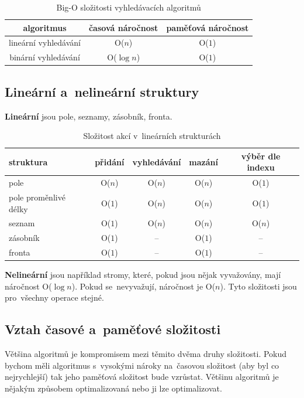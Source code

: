 \begin{table}[h]
	\centering
	\caption{Big-O složitosti vyhledávacích algoritmů}
	\begin{tabular}{|c||c|c|}\hline
		algoritmus           & časová náročnost      & paměťová náročnost \\\hline\hline
		lineární vyhledávání & O($n$)                & O($1$) \\\hline
		binární vyhledávání  & O($\log n$)           & O($1$) \\\hline
	\end{tabular}
\end{table}

\subsection{Lineární a~nelineární struktury}

\textbf{Lineární} jsou pole, seznamy, zásobník, fronta.

\begin{table}[h]
	\centering
	\caption{Složitost akcí v~lineárních strukturách}
	\begin{tabular}{|l||c|c|c|c|}\hline
		struktura             & přidání & vyhledávání & mazání & výběr dle indexu \\\hline\hline
		pole                  & O($n$)  & O($n$)      & O($n$) & O($1$) \\\hline
		pole proměnlivé délky & O($1$)  & O($n$)      & O($n$) & O($1$) \\\hline
		seznam                & O($1$)  & O($n$)      & O($n$) & O($n$) \\\hline
		zásobník              & O($1$)  & --          & O($1$) & --     \\\hline
		fronta                & O($1$)  & --          & O($1$) & --     \\\hline
	\end{tabular}
\end{table}

\textbf{Nelineární} jsou například stromy, které, pokud jsou nějak vyvažovány, mají náročnost O($\log{n}$). Pokud se~nevyvažují, náročnost je O($n$). Tyto složitosti jsou pro~všechny operace stejné.

\subsection{Vztah časové a~paměťové složitosti}

Většina algoritmů je kompromisem mezi těmito dvěma druhy složitosti. Pokud bychom měli algoritmus s~vysokými nároky na~časovou složitost (aby byl co nejrychlejší) tak jeho paměťová složitost bude vzrůstat. Většinu algoritmů je nějakým způsobem optimalizovaná nebo ji lze optimalizovat.

